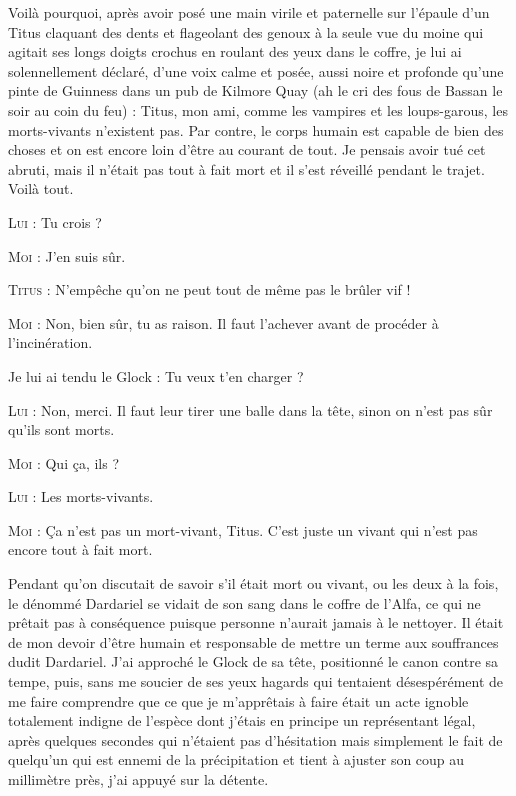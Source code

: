 Voilà pourquoi, après avoir posé une main virile et paternelle sur l’épaule d’un Titus claquant des dents et flageolant des genoux à la seule vue du moine qui agitait ses longs doigts crochus en roulant des yeux dans le coffre, je lui ai solennellement déclaré, d’une voix calme et posée, aussi noire et profonde qu’une pinte de Guinness dans un pub de Kilmore Quay (ah le cri des fous de Bassan le soir au coin du feu) : Titus, mon ami, comme les vampires et les loups-garous, les morts-vivants n’existent pas. Par contre, le corps humain est capable de bien des choses et on est encore loin d’être au courant de tout. Je pensais avoir tué cet abruti, mais il n’était pas tout à fait mort et il s’est réveillé pendant le trajet. Voilà tout.

\begin{dialogue}

\textsc{Lui} : Tu crois ?

\textsc{Moi} : J’en suis sûr.

\textsc{Titus} : N’empêche qu’on ne peut tout de même pas le brûler vif !

\textsc{Moi} : Non, bien sûr, tu as raison. Il faut l’achever avant de procéder à l’incinération.

Je lui ai tendu le Glock : Tu veux t’en charger ?

\textsc{Lui} : Non, merci. Il faut leur tirer une balle dans la tête, sinon on n’est pas sûr qu’ils sont morts.

\textsc{Moi} : Qui ça, ils ?

\textsc{Lui} : Les morts-vivants.

\textsc{Moi} : Ça n’est pas un mort-vivant, Titus. C’est juste un vivant qui n’est pas encore tout à fait mort.

\end{dialogue}

Pendant qu’on discutait de savoir s’il était mort ou vivant, ou les deux à la fois, le dénommé Dardariel se vidait de son sang dans le coffre de l’Alfa, ce qui ne prêtait pas à conséquence puisque personne n’aurait jamais à le nettoyer. Il était de mon devoir d’être humain et responsable de mettre un terme aux souffrances dudit Dardariel. J’ai approché le Glock de sa tête, positionné le canon contre sa tempe, puis, sans me soucier de ses yeux hagards qui tentaient désespérément de me faire comprendre que ce que je m’apprêtais à faire était un acte ignoble totalement indigne de l’espèce dont j’étais en principe un représentant légal, après quelques secondes qui n’étaient pas d’hésitation mais simplement le fait de quelqu’un qui est ennemi de la précipitation et tient à ajuster son coup au millimètre près, j’ai appuyé sur la détente.

